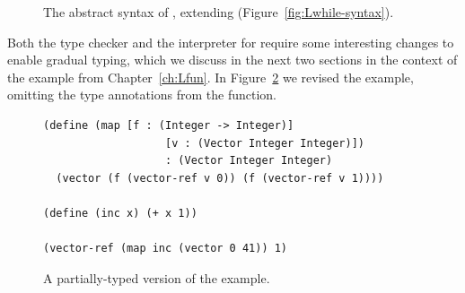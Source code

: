 \documentclass[7x10,nocrop]{TimesAPriori_MIT}%
\newcommand{\gray}[1]{{\color{gray} #1}}
\begin{document}
\begin{figure}[tp]
\centering
\fbox{
  \begin{minipage}{0.96\textwidth}
    \small
\[
\begin{array}{lcl}
  \itm{param} &::=& \Var \MID \LS\Var \key{:} \Type\RS \\
  \Exp &::=& \gray{ \INT{\Int} \VAR{\Var} \MID \LET{\Var}{\Exp}{\Exp} } \\
       &\MID& \gray{ \PRIM{\itm{op}}{\Exp\ldots} }\\
     &\MID& \gray{ \BOOL{\itm{bool}}
      \MID \IF{\Exp}{\Exp}{\Exp} } \\
     &\MID& \gray{ \VOID{} \MID \LP\key{HasType}~\Exp~\Type \RP 
     \MID \APPLY{\Exp}{\Exp\ldots} }\\
  &\MID& \LAMBDA{\LP\itm{param}\ldots\RP}{\Type}{\Exp} \\
  &\MID& \gray{ \SETBANG{\Var}{\Exp} \MID \BEGIN{\LP\Exp\ldots\RP}{\Exp} } \\
  &\MID& \gray{ \WHILE{\Exp}{\Exp} } \\
 \Def &::=& \FUNDEF{\Var}{\LP\itm{param}\ldots\RP}{\Type}{\code{'()}}{\Exp} \\
  \LangGradM{} &::=& \gray{ \PROGRAMDEFSEXP{\code{'()}}{\LP\Def\ldots\RP}{\Exp} }
\end{array}
\]
\end{minipage}
}
\caption{The abstract syntax of \LangGrad{}, extending \LangLoop{} (Figure~\ref{fig:Lwhile-syntax}).}
\label{fig:Rgrad-syntax}
\end{figure}



Both the type checker and the interpreter for \LangGrad{} require some
interesting changes to enable gradual typing, which we discuss in the
next two sections in the context of the  example from
Chapter~\ref{ch:Lfun}.  In Figure~\ref{fig:gradual-map} we
revised the  example, omitting the type annotations from
the  function.

\begin{figure}[btp]
\begin{lstlisting}
(define (map [f : (Integer -> Integer)]
                   [v : (Vector Integer Integer)])
                   : (Vector Integer Integer)
  (vector (f (vector-ref v 0)) (f (vector-ref v 1))))

(define (inc x) (+ x 1))

(vector-ref (map inc (vector 0 41)) 1)
\end{lstlisting}
\caption{A partially-typed version of the  example.}
\label{fig:gradual-map}
\end{figure}
\end{document}
